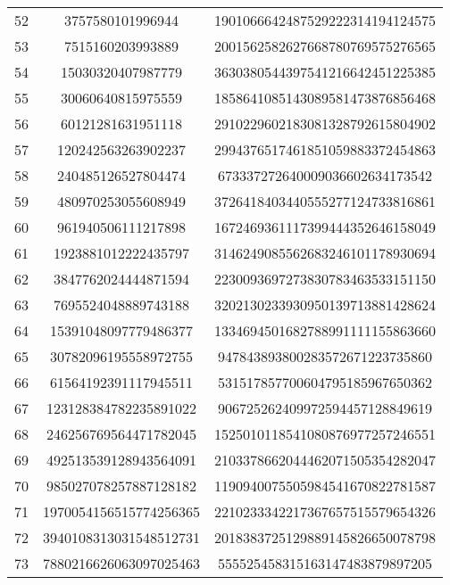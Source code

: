 \documentclass[fleqn]{article}
\begin{document}
\begin{center}
\begin{tabular}{c | c | c}
        \end{tabular}
        \newpage
        \begin{tabular}{c | c | c}
            52 & 3757580101996944 & 1901066642487529222314194124575 \\
            53 & 7515160203993889 & 2001562582627668780769575276565 \\
            54 & 15030320407987779 & 3630380544397541216642451225385 \\
            55 & 30060640815975559 & 1858641085143089581473876856468 \\
            56 & 60121281631951118 & 2910229602183081328792615804902 \\
            57 & 120242563263902237 & 2994376517461851059883372454863 \\
            58 & 240485126527804474 & 673337272640009036602634173542 \\
            59 & 480970253055608949 & 3726418403440555277124733816861 \\
            60 & 961940506111217898 & 1672469361117399444352646158049 \\
            61 & 1923881012222435797 & 3146249085562683246101178930694 \\
            62 & 3847762024444871594 & 2230093697273830783463533151150 \\
            63 & 7695524048889743188 & 3202130233930950139713881428624 \\
            64 & 15391048097779486377 & 1334694501682788991111155863660 \\
            65 & 30782096195558972755 & 947843893800283572671223735860 \\
            66 & 61564192391117945511 & 531517857700604795185967650362 \\
            67 & 123128384782235891022 & 906725262409972594457128849619 \\
            68 & 246256769564471782045 & 1525010118541080876977257246551 \\
            69 & 492513539128943564091 & 2103378662044462071505354282047 \\
            70 & 985027078257887128182 & 1190940075505984541670822781587 \\
            71 & 1970054156515774256365 & 2210233342217367657515579654326 \\
            72 & 3940108313031548512731 & 2018383725129889145826650078798 \\
            73 & 7880216626063097025463 & 555525458315163147483879897205 \\

\end{tabular}
\end{center}
\end{document}
